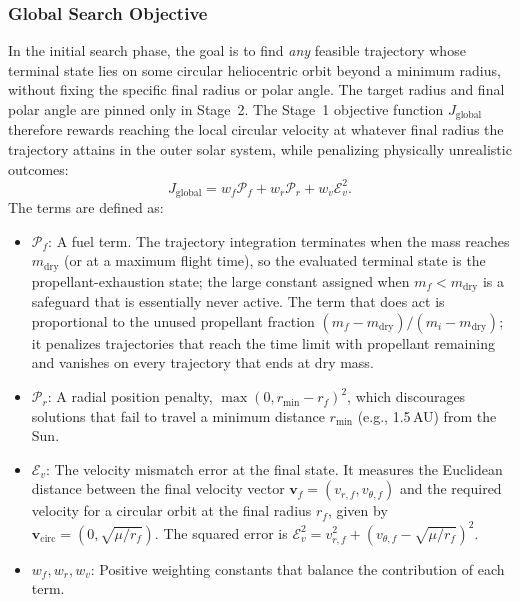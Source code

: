 \documentclass[journal,a4paper]{IEEEtran}
\begin{document}
\subsubsection{Global Search Objective}
In the initial search phase, the goal is to find \emph{any} feasible trajectory whose terminal state lies on some circular heliocentric orbit beyond a minimum radius, without fixing the specific final radius or polar angle. The target radius and final polar angle are pinned only in Stage~2. The Stage~1 objective function $J_\text{global}$ therefore rewards reaching the local circular velocity at whatever final radius the trajectory attains in the outer solar system, while penalizing physically unrealistic outcomes:
\begin{equation}
    J_\text{global} = w_f \mathcal{P}_f + w_r \mathcal{P}_r + w_v \mathcal{E}_v^2.
    \label{eq:obj_global}
\end{equation}
The terms are defined as:
\begin{itemize}
    \item $\mathcal{P}_f$: A fuel term. The trajectory integration terminates when the mass reaches $m_\text{dry}$ (or at a maximum flight time), so the evaluated terminal state is the propellant-exhaustion state; the large constant assigned when $m_f<m_\text{dry}$ is a safeguard that is essentially never active. The term that does act is proportional to the unused propellant fraction $(m_f-m_\text{dry})/(m_i-m_\text{dry})$; it penalizes trajectories that reach the time limit with propellant remaining and vanishes on every trajectory that ends at dry mass.
    \item $\mathcal{P}_r$: A radial position penalty, $\max(0, r_\text{min} - r_f)^2$, which discourages solutions that fail to travel a minimum distance $r_\text{min}$ (e.g., 1.5\,AU) from the Sun.
    \item $\mathcal{E}_v$: The velocity mismatch error at the final state. It measures the Euclidean distance between the final velocity vector $\mathbf{v}_f=(v_{r,f}, v_{\theta,f})$ and the required velocity for a circular orbit at the final radius $r_f$, given by $\mathbf{v}_\text{circ}=(0, \sqrt{\mu/r_f})$. The squared error is $\mathcal{E}_v^2 = v_{r,f}^2 + (v_{\theta,f} - \sqrt{\mu/r_f})^2$.
    \item $w_f, w_r, w_v$: Positive weighting constants that balance the contribution of each term.
\end{itemize}
\end{document}

